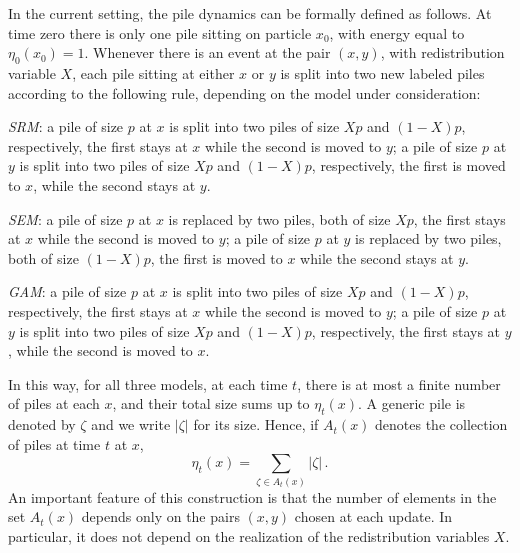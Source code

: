 \documentclass[11pt,reqno]{amsart}
\theoremstyle{remark}
\theoremstyle{definition}
\numberwithin{equation}{section}
\numberwithin{figure}{section}
\begin{document}
 
 
In the current setting, the pile dynamics can be formally defined as follows. 	 
 At time zero there is only one pile sitting on particle $x_0$, with energy equal to $\eta_0(x_0)=1$. Whenever there is an event at the pair $(x,y)$, with redistribution variable $X$, each pile sitting at either  $x$ or  $y$ is split  into two new labeled piles according to the following rule, depending on the model under consideration: 

\smallskip

\emph{SRM}: a pile of size $p$ at $x$ is split into two piles of size $Xp$ and $(1-X)p$, respectively, the first stays at $x$ while the second is moved to  $y$;  a pile of size $p$ at $y$ is split into two piles of size $Xp$ and $(1-X)p$, respectively, the first is moved to  $x$, while the second stays at $y$.  

\emph{SEM}: a pile of size $p$ at $x$ is replaced by two piles, both of size $Xp$, the first stays at $x$ while the second is moved to  $y$; a pile of size $p$ at $y$ is replaced by two piles, both of size $(1-X)p$, the first is moved to $x$ while the second stays at $y$.  

\emph{GAM}: a pile of size $p$ at $x$ is split into two piles of size $Xp$ and $(1-X)p$, respectively, the first stays at $x$ while the second is moved to  $y$; a pile of size $p$ at $y$ is split into two piles of size $Xp$ and $(1-X)p$, respectively, the first stays at $y$, while the second is moved to $x$.  


\smallskip

In this way, for all three models, at each time $t$, there is at most a finite number of piles at each $x$, and their total size sums up to $\eta_t(x)$. A generic pile is denoted by $\zeta$ and we write $|\zeta|$ for its size. Hence, if $A_t(x)$ denotes the collection of piles at time $t$ at  $x$,  
\begin{equation}\label{eq:piledyn1}
		\eta_t(x)=\sum_{\zeta\in A_t(x)}|\zeta|\,.
	\end{equation}
An important feature of this construction is that the number of elements in the set $A_t(x)$ depends only on the pairs $(x,y)$ chosen at each update. In particular, it does not depend on the realization of the redistribution variables $X$.	
\end{document}
